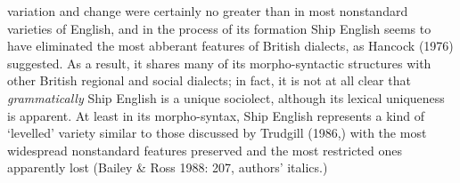 \begin{styleStandard}
variation and change were certainly no greater than in most nonstandard varieties of English, and in the process of its formation Ship English seems to have eliminated the most abberant features of British dialects, as Hancock (1976) suggested. As a result, it shares many of its morpho-syntactic structures with other British regional and social dialects; in fact, it is not at all clear that \textit{grammatically} Ship English is a unique sociolect, although its lexical uniqueness is apparent. At least in its morpho-syntax, Ship English represents a kind of ‘levelled’ variety similar to those discussed by Trudgill (1986,) with the most widespread nonstandard features preserved and the most restricted ones apparently lost (Bailey \& Ross 1988: 207, authors’ italics.) 
\end{styleStandard}


